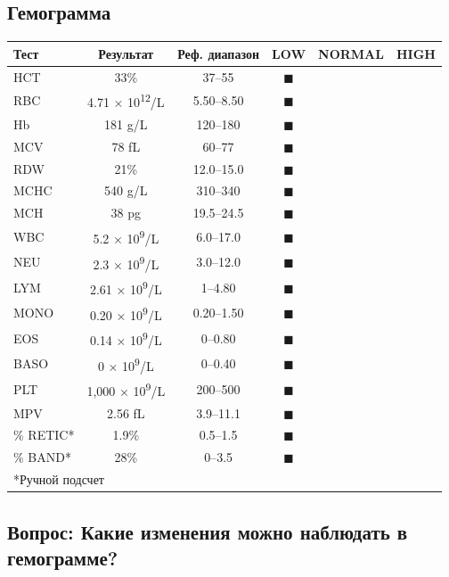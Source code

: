 \documentclass[a4paper,12pt]{book}
\begin{document}
\subsection*{Гемограмма}
\begin{tabular}{lccccc}
\toprule
Тест & Результат & Реф. диапазон & LOW & NORMAL & HIGH \\
\midrule
HCT & 33\% & 37--55 & $\blacksquare$ \\
RBC & 4.71 × 10\textsuperscript{12}/L & 5.50--8.50 & $\blacksquare$ \\
Hb & 181 g/L & 120--180 & $\blacksquare$ \\
MCV & 78 fL & 60--77 & $\blacksquare$ \\
RDW & 21\% & 12.0--15.0 & $\blacksquare$ \\
MCHC & 540 g/L & 310--340 & $\blacksquare$ \\
MCH & 38 pg & 19.5--24.5 & $\blacksquare$ \\
WBC & 5.2 × 10\textsuperscript{9}/L & 6.0--17.0 & $\blacksquare$ \\
NEU & 2.3 × 10\textsuperscript{9}/L & 3.0--12.0 & $\blacksquare$ \\
LYM & 2.61 × 10\textsuperscript{9}/L & 1--4.80 & $\blacksquare$ \\
MONO & 0.20 × 10\textsuperscript{9}/L & 0.20--1.50 & $\blacksquare$ \\
EOS & 0.14 × 10\textsuperscript{9}/L & 0--0.80 & $\blacksquare$ \\
BASO & 0 × 10\textsuperscript{9}/L & 0--0.40 & $\blacksquare$ \\
PLT & 1,000 × 10\textsuperscript{9}/L & 200--500 & $\blacksquare$ \\
MPV & 2.56 fL & 3.9--11.1 & $\blacksquare$ \\
\% RETIC* & 1.9\% & 0.5--1.5 & $\blacksquare$ \\
\% BAND* & 28\% & 0--3.5 & $\blacksquare$ \\
\bottomrule
\multicolumn{6}{l}{*Ручной подсчет}
\end{tabular}

\subsection*{Вопрос: Какие изменения можно наблюдать в гемограмме?}
\end{document}
